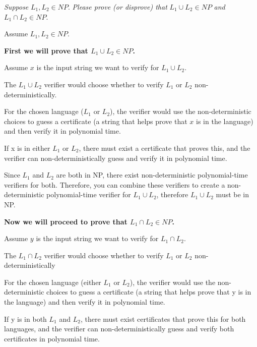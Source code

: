 \documentclass{cis320}
\begin{document}
\maketitle




\HWproblem
\textit{Suppose} \( L_1, L_2 \in NP \). \textit{Please prove (or disprove) that }\( L_1 \cup L_2 \in NP \) \textit{and} \(L_1 \cap L_2 \in NP\).

\:

Assume \( L_1, L_2 \in NP \).

\textbf{First we will prove that \( L_1 \cup L_2 \in NP \).}

Assume \( x \) is the input string we want to verify for \( L_1 \cup L_2\).

The \( L_1 \cup L_2\) verifier would choose whether to verify \(L_1\) or \(L_2\) non-deterministically.

For the chosen language (\(L_1\) or \(L_2\)), the verifier would use the non-deterministic choices to guess a certificate (a string that helps prove that \( x \) is in the language) and then verify it in polynomial time.

If x is in either \(L_1\) or \(L_2\), there must exist a certificate that proves this, and the verifier can non-deterministically guess and verify it in polynomial time.

Since \(L_1\) and \(L_2\) are both in NP, there exist non-deterministic polynomial-time verifiers for both. Therefore, you can combine these verifiers to create a non-deterministic polynomial-time verifier for \( L_1 \cup L_2\), therefore \( L_1 \cup L_2\) must be in NP.

\textbf{Now we will proceed to prove that \(L_1 \cap L_2 \in NP\).}

Assume \( y \) is the input string we want to verify for \( L_1 \cap L_2\).

The \( L_1 \cap L_2\) verifier would choose whether to verify \(L_1\) or \(L_2\) non-deterministically

For the chosen language (either \(L_1\) or \(L_2\)), the verifier would use the non-deterministic choices to guess a certificate (a string that helps prove that y is in the language) and then verify it in polynomial time.

If y is in both \(L_1\) and \(L_2\), there must exist certificates that prove this for both languages, and the verifier can non-deterministically guess and verify both certificates in polynomial time.
\end{document}
